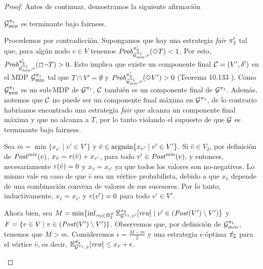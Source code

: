 \begin{proof}
  Antes de continuar, demostramos la siguiente afirmación
  \begin{claim}
    $\mathcal{G}^{\pi_{1}}_{\min}$ es terminante bajo fairness.
  \end{claim}
  \begin{proofofclaim}
    Procedemos por contradicción. Supongamos que hay una estrategia \emph{fair} $\pi_{2}'$ tal que, para algún nodo $v \in V$ tenemos
    $\mathit{Prob}^{\pi_{2}'}_{\mathcal{G}_{\min}^{\pi_{1}},v}(\Diamond T) < 1$.
    Por esto,  $\mathit{Prob}^{\pi_{2}'}_{\mathcal{G}_{\min}^{\pi_{1}},v}(\Box \neg T) > 0$.
    Esto implica que existe un componente final $\mathcal{C} = (V',
    \delta')$ en el MDP $\mathcal{G}_{\min}^{\pi_{1}}$ tal que
    $T \cap V' = \emptyset$ y
    $\mathit{Prob}^{\pi_{2}'}_{\mathcal{G}_{\min}^{\pi_{1}},v}(\Diamond V') > 0$
    (Teorema 10.133 \cite[p.~889]{BaierK08}).
    Como $\mathcal{G}_{\min}^{\pi_{1}}$ es un sub-MDP de
    $\mathcal{G}^{\pi_{1}}$, $\mathcal{C}$ también es un componente final de
    $\mathcal{G}^{\pi_{1}}$.
    Además, notemos que $\mathcal{C}$ no puede ser un componente final máxima en
    $\mathcal{G}^{\pi_{1}}$, de lo contrario habríamos encontrado una estrategia \emph{fair} que alcanza un componente final máxima y que no alcanza a $T$, por lo tanto
    violando el supuesto de que $\mathcal{G}$ es terminante bajo
    fairness.
    
    Sea $m = \min \{ x_{v'} \mid v' \in V' \}$ y
    $\hat{v} \in \operatorname*{argmin}  \{ x_{v'}  \mid v' \in V' \}$.
    Si $\hat{v}\in V_2$, por definición de $\mathit{Post}^{\min}(v)$,
    $x_{\hat{v}} = \mathit{r}(\hat{v}) + x_{v'}$, para todo
    $v' \in \mathit{Post}^{\min}(v)$, y entonces, necesariamente $\mathit{r}(\hat{v})=0$
    y $x_{\hat{v}} = x_{v'}$ ya que todos los valores son no-negativos.
    Lo mismo vale en caso de que $\hat{v}$ sea un vértice probabilista,
    debido a que $x_{\hat{v}}$ depende de una combinación convexa de valores de sus sucesores.
    Por lo tanto, inductivamente, $x_{\hat{v}} = x_{v'}$ y $\mathit{r}(v')=0$ para
    todo $v'\in V'$.

    Ahora bien, sea
    $M =  \min \{ \inf_{\pi_{2} \in \Pi^{\mathcal{F}}_{2}}  \mathbb{E}^{\pi_{2}}_{\mathcal{G}^{\pi_{1}},v'}[\textit{rew}] \mid v' \in (\mathit{Post}(V') \setminus V')\}$
    y 
    $F=\{v \in V \mid v \in (\mathit{Post}(V') \setminus V')\}$.
    Observemos que, por definición de $\mathcal{G}_{min}^{\pi_{1}}$, tenemos que $M > m$.
    Consideremos $\epsilon = \frac{M -m}{2}$ y una estrategia $\epsilon$-óptima
    $\hat{\pi_{2}}$ para el vértice $\hat{v}$, es decir,
    $\mathbb{E}^{\hat{\pi_{2}}}_{\mathcal{G}^{\pi_{1}},\hat{v}}[\textit{rew}] \leq x_{\hat{v}} + \epsilon$.
    

\end{proofofclaim}
\end{proof}
